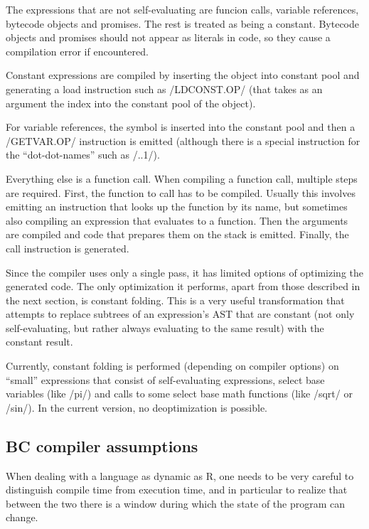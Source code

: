 {The expressions that are not self-evaluating are funcion calls, variable references, bytecode objects and promises. The rest is treated as being a constant. Bytecode objects and promises should not appear as literals in code, so they cause a compilation error if encountered.

Constant expressions are compiled by inserting the object into constant pool and generating a load instruction such as \rinline/LDCONST.OP/ (that takes as an argument the index into the constant pool of the object).

For variable references, the symbol is inserted into the constant pool and then a \rinline/GETVAR.OP/ instruction is emitted (although there is a special instruction for the ``dot-dot-names'' such as \rinline/..1/).

Everything else is a function call. When compiling a function call, multiple steps are required. First, the function to call has to be compiled. Usually this involves emitting an instruction that looks up the function by its name, but sometimes also compiling an expression that evaluates to a function. Then the arguments are compiled and code that prepares them on the stack is emitted. Finally, the call instruction is generated.

Since the compiler uses only a single pass, it has limited options of optimizing the generated code. The only optimization it performs, apart from those described in the next section, is constant folding. This is a very useful transformation that attempts to replace subtrees of an expression's AST that are constant (not only self-evaluating, but rather always evaluating to the same result) with the constant result.

Currently, constant folding is performed (depending on compiler options) on ``small'' expressions that consist of self-evaluating expressions, select base variables (like \rinline/pi/) and calls to some select base math functions (like \rinline/sqrt/ or \rinline/sin/). In the current version, no deoptimization is possible.

\subsection{BC compiler assumptions\label{assumptions}}

When dealing with a language as dynamic as R, one needs to be very careful to distinguish compile time from execution time, and in particular to realize that between the two there is a window during which the state of the program can change.

}
